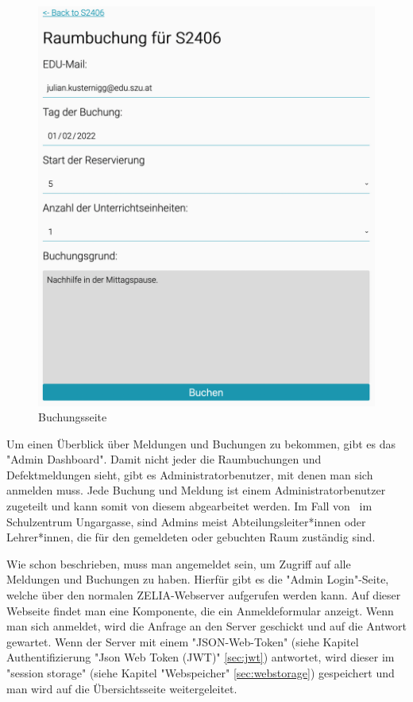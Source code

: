 \begin{figure}[H]
    \centering
    \includegraphics[width=120mm]{media/WebComponents/Buchungsseite_light.png}
    \caption{Buchungsseite}
\end{figure}


\label{sec:webcomplogdash}

Um einen Überblick über Meldungen und Buchungen zu bekommen, gibt es das "Admin Dashboard". Damit nicht jeder die Raumbuchungen und Defektmeldungen sieht, gibt es Administratorbenutzer, mit denen man sich anmelden muss. Jede Buchung und Meldung ist einem Administratorbenutzer zugeteilt und kann somit von diesem abgearbeitet werden. Im Fall von \ZELIA\ im Schulzentrum Ungargasse, sind Admins meist Abteilungsleiter*innen oder Lehrer*innen, die für den gemeldeten oder gebuchten Raum zuständig sind. 

Wie schon beschrieben, muss man angemeldet sein, um Zugriff auf alle Meldungen und Buchungen zu haben. Hierfür gibt es die "Admin Login"-Seite, welche über den normalen ZELIA-Webserver aufgerufen werden kann. Auf dieser Webseite findet man eine Komponente, die ein Anmeldeformular anzeigt. Wenn man sich anmeldet, wird die Anfrage an den Server geschickt und auf die Antwort gewartet. Wenn der Server mit einem "JSON-Web-Token" (siehe Kapitel Authentifizierung "Json Web Token (JWT)" \ref{sec:jwt}) antwortet, wird dieser im "session storage" (siehe Kapitel "Webspeicher" \ref{sec:webstorage}) gespeichert und man wird auf die Übersichtsseite weitergeleitet.

